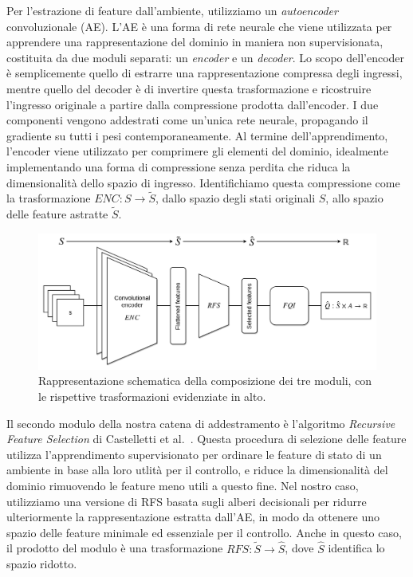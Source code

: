 Per l'estrazione di feature dall'ambiente, utilizziamo un \textit{autoencoder} 
convoluzionale (AE).
L'AE \`e una forma di rete neurale che viene utilizzata per apprendere una 
rappresentazione del dominio in maniera non supervisionata, costituita da due 
moduli separati: un \textit{encoder} e un \textit{decoder}.
Lo scopo dell'encoder \`e semplicemente quello di estrarre una rappresentazione
compressa degli ingressi, mentre quello del decoder \`e di invertire questa
trasformazione e ricostruire l'ingresso originale a partire dalla compressione 
prodotta dall'encoder. 
I due componenti vengono addestrati come un'unica rete neurale, propagando il 
gradiente su tutti i pesi contemporaneamente. 
Al termine dell'apprendimento, l'encoder viene utilizzato per comprimere gli 
elementi del dominio, idealmente implementando una forma di compressione senza 
perdita che riduca la dimensionalit\`a dello spazio di ingresso. 
Identifichiamo questa compressione come la trasformazione $ENC: S \rightarrow \tilde{S}$, 
dallo spazio degli stati originali $S$, allo spazio delle feature astratte $\tilde{S}$.
%
\begin{figure}
\includegraphics[width=\textwidth]{pictures/full_pipeline}
\centering
\caption[Rappresentazione dei tre moduli principali]{Rappresentazione
						     schematica della composizione dei tre moduli, con le rispettive
						     trasformazioni evidenziate in alto.}
\label{f:abs_full}
\end{figure}
%

Il secondo modulo della nostra catena di addestramento \`e l'algoritmo 
\textit{Recursive Feature Selection} di Castelletti et al.\ \cite{castelletti2011tree}.
Questa procedura di selezione delle feature utilizza l'apprendimento supervisionato
per ordinare le feature di stato di un ambiente in base alla loro utlit\`a per 
il controllo, e riduce la dimensionalit\`a del dominio rimuovendo le feature 
meno utili a questo fine. 
Nel nostro caso, utilizziamo una versione di RFS basata sugli alberi decisionali
per ridurre ulteriormente la rappresentazione estratta dall'AE, in modo da 
ottenere uno spazio delle feature minimale ed essenziale per il controllo. 
Anche in questo caso, il prodotto del modulo \`e una trasformazione 
$RFS: \tilde{S} \rightarrow \hat{S}$, dove $\hat{S}$ identifica lo spazio 
ridotto. 

